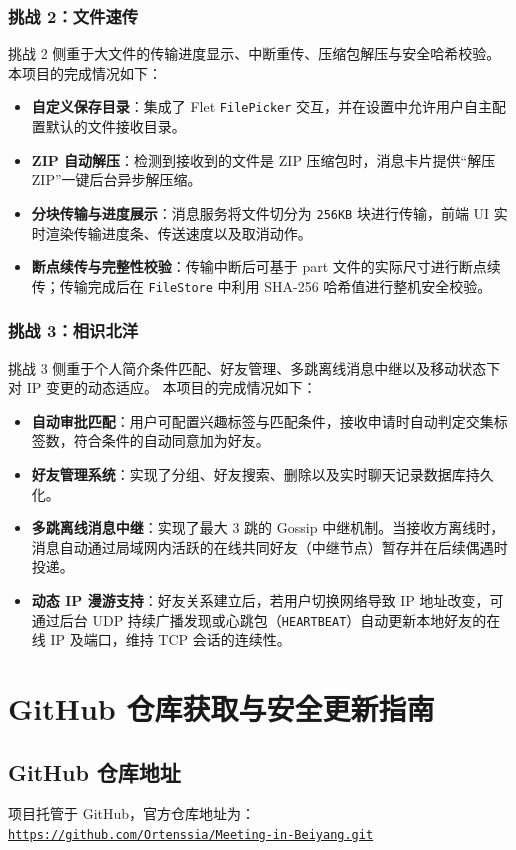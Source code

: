 \documentclass[UTF8]{ctexart}
\begin{document}
\subsubsection{挑战 2：文件速传}
挑战 2 侧重于大文件的传输进度显示、中断重传、压缩包解压与安全哈希校验。
本项目的完成情况如下：
\begin{itemize}
    \item \textbf{自定义保存目录}：集成了 Flet \texttt{FilePicker} 交互，并在设置中允许用户自主配置默认的文件接收目录。
    \item \textbf{ZIP 自动解压}：检测到接收到的文件是 ZIP 压缩包时，消息卡片提供“解压 ZIP”一键后台异步解压缩。
    \item \textbf{分块传输与进度展示}：消息服务将文件切分为 \texttt{256KB} 块进行传输，前端 UI 实时渲染传输进度条、传送速度以及取消动作。
    \item \textbf{断点续传与完整性校验}：传输中断后可基于 part 文件的实际尺寸进行断点续传；传输完成后在 \texttt{FileStore} 中利用 SHA-256 哈希值进行整机安全校验。
\end{itemize}

\subsubsection{挑战 3：相识北洋}
挑战 3 侧重于个人简介条件匹配、好友管理、多跳离线消息中继以及移动状态下对 IP 变更的动态适应。
本项目的完成情况如下：
\begin{itemize}
    \item \textbf{自动审批匹配}：用户可配置兴趣标签与匹配条件，接收申请时自动判定交集标签数，符合条件的自动同意加为好友。
    \item \textbf{好友管理系统}：实现了分组、好友搜索、删除以及实时聊天记录数据库持久化。
    \item \textbf{多跳离线消息中继}：实现了最大 3 跳的 Gossip 中继机制。当接收方离线时，消息自动通过局域网内活跃的在线共同好友（中继节点）暂存并在后续偶遇时投递。
    \item \textbf{动态 IP 漫游支持}：好友关系建立后，若用户切换网络导致 IP 地址改变，可通过后台 UDP 持续广播发现或心跳包（\texttt{HEARTBEAT}）自动更新本地好友的在线 IP 及端口，维持 TCP 会话的连续性。
\end{itemize}

\section{GitHub 仓库获取与安全更新指南}

\subsection{GitHub 仓库地址}
项目托管于 GitHub，官方仓库地址为：
\href{https://github.com/Ortenssia/Meeting-in-Beiyang.git}{\texttt{https://github.com/Ortenssia/Meeting-in-Beiyang.git}}
\end{document}
